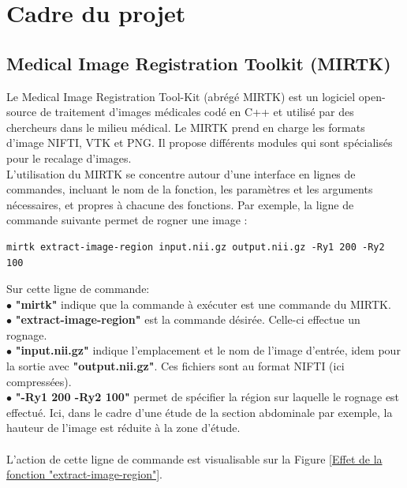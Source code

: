 \documentclass[10pt]{report}
\begin{document}
	\section{Cadre du projet} 
	\subsection{Medical Image Registration Toolkit (MIRTK)}
	Le Medical Image Registration Tool-Kit (abrégé MIRTK) est un logiciel open-source de traitement d'images médicales codé en C++ et utilisé par des chercheurs dans le milieu médical. Le MIRTK prend en charge les formats d'image NIFTI, VTK et PNG. Il propose différents modules qui sont spécialisés pour le recalage d'images. \\ 
	L'utilisation du MIRTK se concentre autour d'une interface en lignes de commandes, incluant le nom de la fonction, les paramètres et les arguments nécessaires, et propres à chacune des fonctions. Par exemple, la ligne de commande suivante permet de rogner une image :
	
	\begin{lstlisting}
mirtk extract-image-region input.nii.gz output.nii.gz -Ry1 200 -Ry2 100
	\end{lstlisting}
	
	\noindent Sur cette ligne de commande:\\
	\t{$\bullet$} \textbf{"mirtk"} indique que la commande à exécuter est une commande du MIRTK.\\
	\t{$\bullet$} \textbf{"extract-image-region"} est la commande désirée. Celle-ci effectue un rognage.\\
	\t{$\bullet$} \textbf{"input.nii.gz"} indique l'emplacement et le nom de l'image d'entrée, idem pour la sortie avec \textbf{"output.nii.gz"}. Ces fichiers sont au format NIFTI (ici compressées).\\
	\t{$\bullet$} \textbf{"-Ry1 200 -Ry2 100"} permet de spécifier la région sur laquelle le rognage est effectué. Ici, dans le cadre d'une étude de la section abdominale par exemple, la hauteur de l'image est réduite à la zone d'étude. \\
	\\L'action de cette ligne de commande est visualisable sur la Figure \ref{Effet de la fonction "extract-image-region"}.
	
\end{document}
